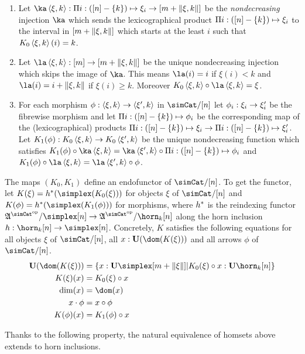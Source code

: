 \documentclass[csh.tex]{subfiles}
\begin{document}
\begin{definition}
\begin{enumerate}
\item Let $\ka\tuplet{\xi,k}\of\product{i\of([n]-\set k)}{\xi_i} \to [m+\norm{\xi,k}]$ be the \emph{nondecreasing} injection $\ka$ which sends the lexicographical product $\Pi i:([n]-\left\{k\right\}) \mapsto{\xi_i}$ to the interval in $[m+\Vert \xi,k \Vert]$ which starts at the least $i$ such that $K_0\left\langle \xi,k \right\rangle(i)=k$.

\item Let $\la\tuplet{\xi,k}\of[m]\to[m+\norm{\xi,k}]$ be the unique nondecreasing injection which skips the image of $\ka$. This means $\la(i)=i$ if $\xi(i)<k$ and $\la(i)=i+\norm{\xi,k}$ if $\xi(i)\geq k$. Moreover $K_0\tuplet{\xi,k}\circ\la\tuplet{\xi,k} = \xi$.

\item For each morphism $\phi:\left\langle \xi,k \right\rangle\to\left\langle \xi',k \right\rangle$ in $\simCat/[n]$ let $\phi_i:\xi_i\to\xi'_i$ be the fibrewise morphism and let $\Pi i:([n]-\left\{k\right\}) \mapsto{\phi_i}$ be the corresponding map of the (lexicographical) products $\Pi i:([n]-\left\{k\right\}) \mapsto{\xi_i}\to\Pi i:([n]-\left\{k\right\}) \mapsto{\xi'_i}$. Let $K_1(\phi): K_0\left\langle \xi,k \right\rangle\to K_0\left\langle \xi',k \right\rangle$ be the unique nondecreasing function which satisfies $K_1(\phi)\circ \ka\tuplet{\xi,k} = \ka\tuplet{\xi',k}\circ \product{i\of([n]-\set k)}{\phi_i}$ and $K_1(\phi)\circ \la\tuplet{\xi,k} = \la\tuplet{\xi',k}\circ \phi$.
\end{enumerate}

The maps $(K_0,K_1)$ define an endofunctor of $\simCat/[n]$. To get the functor, let $K(\xi) = h\ri(\simplex(K_0(\xi)))$ for objects $\xi$ of $\simCat/[n]$ and $K(\phi) = h\ri(\simplex(K_1(\phi)))$ for morphisms, where $h^*$ is the reindexing functor $\ambient\s/\simplex[n]\to\ambient\s/\horn_k[n]$ along the horn inclusion $h\of \horn_k[n]\to\simplex[n]$. Concretely, $K$ satisfies the following equations for all objects $\xi$ of $\simCat/[n]$, all $x\of \base(\dom(K(\xi)))$ and all arrows $\phi$ of $\simCat/[n]$.
\begin{align*}
\base(\dom(K(\xi))) &= \set{ x\of\base\simplex[m+\norm\xi]| K_0(\xi)\circ x\of\base\horn_k[n]}\\
K(\xi)(x) &= K_0(\xi)\circ x \\
\dim(x) &= \dom(x) \\
x\cdot\phi &= x\circ\phi \\
K(\phi)(x) &= K_1(\phi)\circ x
\end{align*}
\end{definition}

Thanks to the following property, the natural equivalence of homsets above extends to horn inclusions.
\end{document}
